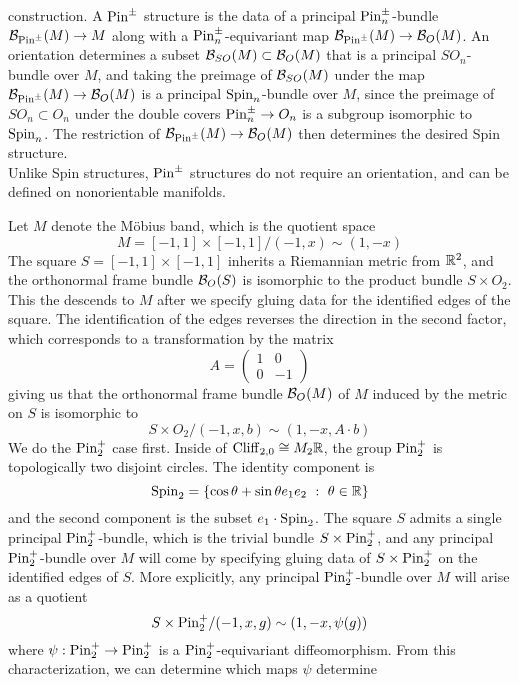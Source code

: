 construction. A $\mathrm{Pin}^\pm$ structure is the data of a principal
$\mathrm{Pin}^\pm_n$-bundle $\mathcal{B}_{\mathrm{Pin}^\pm}(M) \to M$ along with a
$\mathrm{Pin}^\pm_n$-equivariant map $\mathcal{B}_{\mathrm{Pin}^\pm}(M) \to \mathcal{B}_O(M)$. An orientation
determines a subset $\mathcal{B}_{SO}(M) \subset \mathcal{B}_O(M)$ that is a principal
$SO_n$-bundle over $M$, and taking the preimage of $\mathcal{B}_{SO}(M)$ under the
map $\mathcal{B}_{\mathrm{Pin}^\pm}(M) \to \mathcal{B}_O(M)$ is a principal $\mathrm{Spin}_n$-bundle over $M$,
since the preimage of $SO_n \subset O_n$ under the double covers
$\mathrm{Pin}^\pm_n \to O_n$ is a subgroup isomorphic to $\mathrm{Spin}_n$.
The restriction of $\mathcal{B}_{\mathrm{Pin}^\pm}(M) \to \mathcal{B}_O(M)$ then determines the
desired Spin structure.\\

Unlike Spin structures, $\mathrm{Pin}^\pm$ structures do not require an orientation,
and can be defined on nonorientable manifolds.
%
\begin{exmp}
Let $M$ denote the M\"obius band, which is the quotient space
\[
M = [-1,1] \times [-1,1] / (-1, x) \sim (1, -x)
\]
The square $S = [-1,1] \times [-1,1]$ inherits a Riemannian metric from $\mathbb{R}^2$,
and the orthonormal frame bundle $\mathcal{B}_O(S)$ is isomorphic to
the product bundle $S \times O_2$. This the descends to $M$ after
we specify gluing data for the identified edges of the square. The identification
of the edges reverses the direction in the second factor, which corresponds to
a transformation by the matrix
\[
A = \begin{pmatrix}
1 & 0 \\
0 & -1
\end{pmatrix}
\]
giving us that the orthonormal frame bundle $\mathcal{B}_O(M)$ of $M$ induced by the
metric on $S$ is isomorphic to
\[
S\times O_2 / (-1,x, b) \sim (1,-x, A \cdot b)
\]
We do the $\mathrm{Pin}^+_2$ case first. Inside of $\operatorname{Cliff}_{2,0} \cong M_2\mathbb{R}$,
the group $\mathrm{Pin}_2^+$ is topologically two disjoint circles. The identity component
is \[
\mathrm{Spin}_2 = \left\lbrace \cos\theta + \sin\theta e_1e_2 ~:~ \theta \in \mathbb{R} \right\rbrace
\]
and the second component is the subset $e_1 \cdot \mathrm{Spin}_2$. The square
$S$ admits a single principal $\mathrm{Pin}_2^+$-bundle, which is the trivial bundle
$S \times \mathrm{Pin}_2^+$, and any principal $\mathrm{Pin}_2^+$-bundle over $M$ will come
by specifying gluing data of $S \times \mathrm{Pin}_2^+$ on the identified edges of $S$.
More explicitly, any principal $\mathrm{Pin}_2^+$-bundle over $M$ will arise as a
quotient
\[
S \times \mathrm{Pin}_2^+ / (-1,x,g) \sim (1, -x, \psi(g))
\]
where $\psi : \mathrm{Pin}_2^+ \to \mathrm{Pin}_2^+$ is a $\mathrm{Pin}_2^+$-equivariant diffeomorphism.
From this characterization, we can determine which maps $\psi$ determine

\end{exmp}
